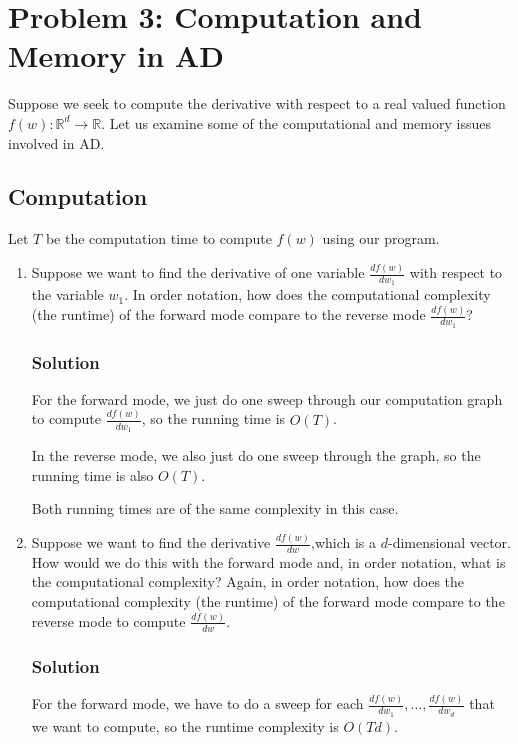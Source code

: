 \documentclass[letterpaper,11pt]{article}
\begin{document}
\section*{Problem 3: Computation and Memory in AD}

Suppose we seek to compute the derivative with respect to a real valued function
$f\left(w\right) : \mathbb{R}^d \rightarrow \mathbb{R}$. Let us examine some of
the computational and memory issues involved in AD.

\subsection*{Computation}

Let $T$ be the computation time to compute $f(w)$ using our program.

\begin{enumerate}
\item Suppose we want to find the derivative of one variable $\frac{df(w)}{dw_1}$
  with respect to the variable $w_1$. In order notation, how does the
  computational complexity (the runtime) of the forward mode compare to the
  reverse mode $\frac{df(w)}{dw_1}$?
  \subsubsection*{Solution}

  For the forward mode, we just do one sweep through our computation graph to
  compute $\frac{df(w)}{dw_1}$, so the running time is $O(T)$.

  In the reverse mode, we also just do one sweep through the graph, so the
  running time is also $O(T)$.

  Both running times are of the same complexity in this case.
  
\item Suppose we want to find the derivative $\frac{df(w)}{dw}$,which is a
  $d$-dimensional vector. How would we do this with the forward mode and, in
  order notation, what is the computational complexity? Again, in order
  notation, how does the computational complexity (the runtime) of the forward
  mode compare to the reverse mode to compute $\frac{df(w)}{dw}$.
  \subsubsection*{Solution}

  For the forward mode, we have to do a sweep for each
  $\frac{df(w)}{dw_1},\ldots,\frac{df(w)}{dw_d}$ that we want to compute, so the
  runtime complexity is $O(Td)$.


\end{enumerate}
\end{document}
